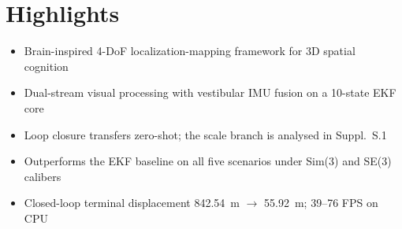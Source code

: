 \documentclass{article}
\begin{document}
\section*{Highlights}
\begin{itemize}
\item Brain-inspired 4-DoF localization-mapping framework for 3D spatial cognition
\item Dual-stream visual processing with vestibular IMU fusion on a 10-state EKF core
\item Loop closure transfers zero-shot; the scale branch is analysed in Suppl.~S.1
\item Outperforms the EKF baseline on all five scenarios under Sim(3) and SE(3) calibers
\item Closed-loop terminal displacement 842.54~m $\to$ 55.92~m; 39--76 FPS on CPU
\end{itemize}
\end{document}
